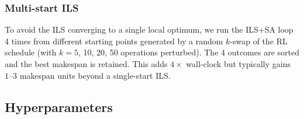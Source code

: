 \documentclass[10pt]{article}
\theoremstyle{definition}
\begin{document}
\subsubsection{Multi-start ILS}
To avoid the ILS converging to a single local optimum, we
run the ILS+SA loop 4 times from different starting points
generated by a random $k$-swap of the RL schedule (with
$k = 5$, 10, 20, 50 operations perturbed). The 4 outcomes
are sorted and the best makespan is retained. This adds
$4\times$ wall-clock but typically gains $1\text{--}3$
makespan units beyond a single-start ILS.

\subsection{Hyperparameters}
\end{document}
